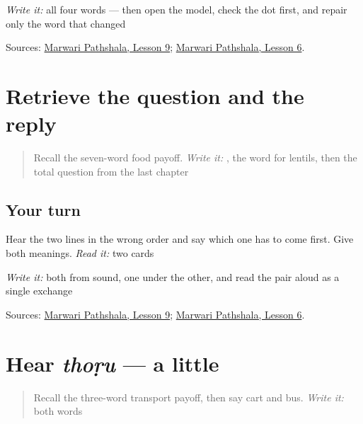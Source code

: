 \emph{Write it:} all four words — then open the model, check the dot first, and repair only the word that changed

\begin{tcolorbox}[breakable,colback=teal!4,colframe=teal!35!black,title={Before you move on}]
Sources: \href{https://www.marwaripathshala.com/marwari-lesson-9-english}{Marwari Pathshala, Lesson 9}; \href{https://www.marwaripathshala.com/marwari-lesson-6-english}{Marwari Pathshala, Lesson 6}.
\end{tcolorbox}
\section[Practice]{Retrieve the question and the reply}

\label{lesson:MW-R23-answer-two}



\begin{quote}
Recall the seven-word food payoff. \emph{Write it:} \textbf{}, the word for lentils, then the total question from the last chapter
\end{quote}

\subsection*{Your turn}
Hear the two lines in the wrong order and say which one has to come first. Give both meanings. \emph{Read it:} two cards

\emph{Write it:} both from sound, one under the other, and read the pair aloud as a single exchange

\begin{tcolorbox}[breakable,colback=teal!4,colframe=teal!35!black,title={Before you move on}]
Sources: \href{https://www.marwaripathshala.com/marwari-lesson-9-english}{Marwari Pathshala, Lesson 9}; \href{https://www.marwaripathshala.com/marwari-lesson-6-english}{Marwari Pathshala, Lesson 6}.
\end{tcolorbox}
\section[thoṛu]{Hear \emph{thoṛu} — a little}

\label{lesson:MW-C23-hear-thodu}



\begin{quote}
Recall the three-word transport payoff, then say cart and bus. \emph{Write it:} both words
\end{quote}

